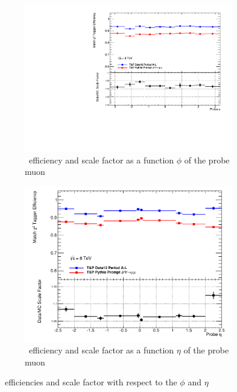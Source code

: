 \begin{figure}[tbhp]
  \centering
  \begin{subfigure}[b]{0.85\textwidth}
    \includegraphics[width=\textwidth]{PartCalibration2012/Plots/SFPlots/phi_smt.pdf}
    \caption{\xsm\ efficiency and scale factor as a function $\phi$ of the probe muon} \label{fig:CalibrationPhi}
  \end{subfigure}

  \begin{subfigure}[b]{0.85\textwidth}
    \includegraphics[width=\textwidth]{PartCalibration2012/Plots/SFPlots/eta_smt.pdf}
    \caption{\xsm\ efficiency and scale factor as a function $\eta$ of the probe muon} \label{fig:CalibrationEta}
  \end{subfigure}
  \caption{\xsm\ efficiencies and scale factor with respect to the  $\phi$ and  $\eta$} \label{fig:CalibrationAngularResults}
\end{figure}

